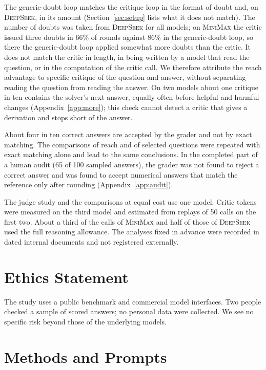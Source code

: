 \documentclass[11pt]{article}
\newcommand{\ds}{\textsc{DeepSeek}}
\newcommand{\mm}{\textsc{MiniMax}}
\begin{document}
The generic-doubt loop matches the critique loop in the format of doubt and, on \ds, in its amount (Section~\ref{sec:setup} lists what it does not match).
The number of doubts was taken from \ds{} for all models; on \mm{} the critic issued three doubts in 66\% of rounds against 86\% in the generic-doubt loop, so there the generic-doubt loop applied somewhat more doubts than the critic.
It does not match the critic in length, in being written by a model that read the question, or in the computation of the critic call.
We therefore attribute the reach advantage to specific critique of the question and answer, without separating reading the question from reading the answer.
On two models about one critique in ten contains the solver's next answer, equally often before helpful and harmful changes (Appendix~\ref{app:more}); this check cannot detect a critic that gives a derivation and stops short of the answer.

About four in ten correct answers are accepted by the grader and not by exact matching.
The comparisons of reach and of selected questions were repeated with exact matching alone and lead to the same conclusions.
In the completed part of a human audit (65 of 100 sampled answers), the grader was not found to reject a correct answer and was found to accept numerical answers that match the reference only after rounding (Appendix~\ref{app:audit}).

The judge study and the comparisons at equal cost use one model.
Critic tokens were measured on the third model and estimated from replays of 50 calls on the first two.
About a third of the calls of \mm{} and half of those of \ds{} used the full reasoning allowance.
The analyses fixed in advance were recorded in dated internal documents and not registered externally.

\section*{Ethics Statement}

The study uses a public benchmark and commercial model interfaces.
Two people checked a sample of scored answers; no personal data were collected.
We see no specific risk beyond those of the underlying models.



\appendix

\section{Methods and Prompts}
\label{app:prompts}
\end{document}
